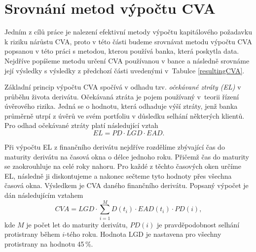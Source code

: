 \documentclass[a4paper,12pt]{report}
\theoremstyle{definition} \newtheorem{definice}[veta]{Definice}
\theoremstyle{remark}
\begin{document}

\section{Srovnání metod výpočtu CVA}
Jedním z cílů práce je nalezení efektivní metody výpočtu kapitálového požadavku k riziku nárůstu CVA, proto v této části budeme srovnávat metodu výpočtu CVA popsanou v této práci s metodou, kterou používá banka, která poskytla data.
Nejdříve popíšeme metodu určení CVA používanou v bance a následně srovnáme její výsledky s výsledky z předchozí části uvedenými v~Tabulce \ref{resultingCVA}. 

Základní princip výpočtu CVA spočívá v odhadu tzv. \textit{očekávané ztráty (EL)} v průběhu života derivátu. 
Očekávaná ztráta je pojem používaný v~teorii řízení úvěrového rizika.
Jedná se o hodnotu, která odhaduje výší ztráty, jenž banka průměrně utrpí z úvěrů ve svém portfoliu v důsledku selhání některých klientů. 
Pro odhad očekávané ztráty platí následující vztah 
\begin{equation}\label{el}
EL=PD\cdot LGD\cdot EAD.
\end{equation}

Při výpočtu EL z finančního derivátu nejdříve rozdělíme zbývající čas do maturity derivátu na časová okna o délce jednoho roku. 
Přičemž čas do maturity se zaokrouhluje na celé roky nahoru.
Pro každé z těchto časových oken určíme EL, následně ji diskontujeme a nakonec sečteme tyto hodnoty přes všechna časová okna.
Výsledkem je CVA daného finančního derivátu.
Popsaný výpočet je dán následujícím vztahem
\begin{equation}\label{CVA_banka}
CVA=LGD\cdot\sum_{i=1}^M D(t_i)\cdot EAD(t_i)\cdot PD(i),
\end{equation}
kde $M$ je počet let do maturity derivátu, $PD(i)$ je pravděpodobnost selhání protistrany během $i$-tého roku.
Hodnota LGD je nastavena pro všechny protistrany na hodnotu 45\,\%.
\end{document}
